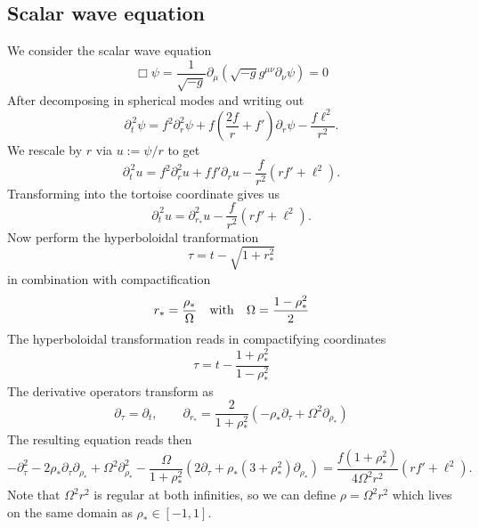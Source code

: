 \documentclass[a4paper]{article}
\begin{document}
\subsection*{Scalar wave equation}
We consider the scalar wave equation
\[ \Box \psi = \frac{1}{\sqrt{-g}} \partial_\mu \left(\sqrt{-g} g^{\mu\nu} \partial_\nu \psi \right) = 0  \]
After decomposing in spherical modes and writing out
\[ \partial_{{t}}^{\,2}\psi  = f^2 \partial_r^2 \psi + f \left(\frac{2f}{r}+f'\right) \partial_r \psi - \frac{f \ell^2}{r^2}. \]
We rescale by $r$ via $u:=\psi/r$ to get
\[ \partial_{{t}}^{\,2}u  = f^2 \partial_r^2 u + f f' \partial_r u - \frac{f}{r^2} (r f' + \ell^2). \]
Transforming into the tortoise coordinate gives us
\[ \partial_{{t}}^{\,2}u  = \partial_{r_\ast}^2 u  - \frac{f}{r^2} (r f' + \ell^2). \]
Now perform the hyperboloidal tranformation
\[ \tau = t-\sqrt{1+r_\ast^2} \]
in combination with compactification
\[ r_\ast = \frac{\rho_\ast}{\Omega} \quad {\rm with} \quad \Omega=\frac{1-\rho_\ast^2}{2} \]
The hyperboloidal transformation reads in compactifying coordinates
\[ \tau = t - \frac{1+\rho_\ast^2}{1-\rho_\ast^2}\]
The derivative operators transform as
\[ \partial_\tau = \partial_t, \qquad \partial_{r_\ast} = \frac{2}{1+\rho_\ast^2} \left(-\rho_\ast \partial_\tau + \Omega^2 \partial_{\rho_\ast}\right)  \]
The resulting equation reads then
\[ -\partial_\tau^2 - 2 \rho_\ast \partial_\tau \partial_{\rho_\ast} + \Omega^2 \partial_{\rho_\ast}^2 
- \frac{\Omega}{1+\rho_\ast^2}\left(2 \partial_\tau + \rho_\ast (3+\rho_\ast^2) \partial_{\rho_\ast}\right)=
\frac{f (1+\rho_\ast^2)}{4\Omega^2 r^2}(r f'+\ell^2). \]
Note that $\Omega^2 r^2$ is regular at both infinities, so we can define $\rho = \Omega^2 r^2$ which lives on the same domain as $\rho_\ast\in[-1,1]$.
\end{document}
